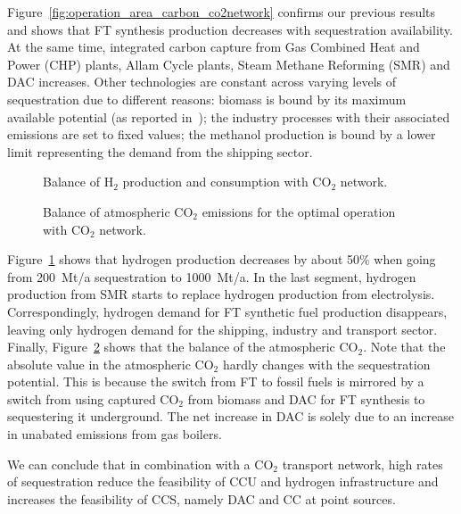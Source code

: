 \documentclass[twocolumn]{article}
\newcommand{\carbon}{CO$_2$}
\newcommand{\hydrogen}{H$_2$}
\begin{document}
Figure~\ref{fig:operation_area_carbon_co2network} confirms our previous results and shows that FT synthesis production decreases with sequestration availability. At the same time, integrated carbon capture from Gas Combined Heat and Power (CHP) plants, Allam Cycle plants, Steam Methane Reforming (SMR) and DAC increases. Other technologies are constant across varying levels of sequestration due to different reasons: biomass is bound by its maximum available potential (as reported in~\cite{europeancommissionjointresearchcentreENSPRESOBIOMASS2019}); the industry processes with their associated emissions are set to fixed values; the methanol production is bound by a lower limit representing the demand from the shipping sector.

\begin{figure}[h]
    \centering
    \caption{Balance of \hydrogen{} production and consumption with \carbon{} network.}
    \label{fig:operation_area_hydrogen_co2network}
\end{figure}
%
\begin{figure}[h]
    \centering
    \caption{Balance of atmospheric \carbon{} emissions for the optimal operation with \carbon{} network.}
    \label{fig:operation_area_co2_co2network}
\end{figure}
%
Figure~\ref{fig:operation_area_hydrogen_co2network} shows that hydrogen production decreases by about 50\% when going from 200~Mt/a sequestration to 1000~Mt/a. In the last segment, hydrogen production from SMR starts to replace hydrogen production from electrolysis. Correspondingly, hydrogen demand for FT synthetic fuel production disappears, leaving only hydrogen demand for the shipping, industry and transport sector. Finally, Figure~\ref{fig:operation_area_co2_co2network} shows that the balance of the atmospheric \carbon{}. Note that the absolute value in the atmospheric \carbon{} hardly changes with the sequestration potential. This is because the switch from FT to fossil fuels is mirrored by a switch from using captured \carbon{} from biomass and DAC for FT synthesis to sequestering it underground. The net increase in DAC is solely due to an increase in unabated emissions from gas boilers.


We can conclude that in combination with a \carbon{} transport network, high rates of sequestration reduce the feasibility of CCU and hydrogen infrastructure and increases the feasibility of CCS, namely DAC and CC at point sources.
\end{document}
